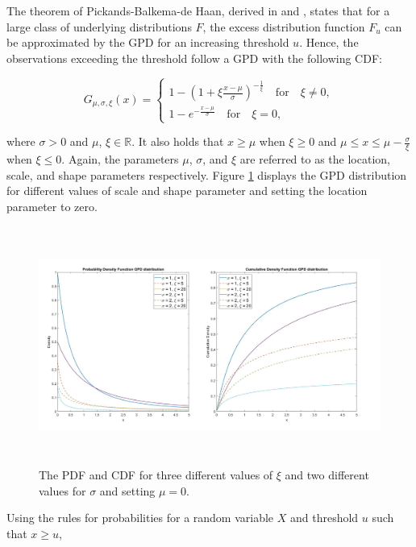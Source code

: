 \documentclass[a4paper,12pt]{article}
\theoremstyle{plain}
\begin{document}
The theorem of Pickands-Balkema-de Haan, derived in  and , states that for a large class of underlying distributions $F$, the excess distribution function $F_u$ can be approximated by the GPD for an increasing threshold $u$. Hence, the observations exceeding the threshold follow a GPD with the following CDF:

\begin{equation}
    G_{\mu, \sigma, \xi}(x) = \begin{cases}
               1 - (1 + \xi\frac{x-\mu}{\sigma})^{-\frac{1}{\xi}} \quad \textrm{for} \quad \xi\neq0,\\
               1 - e^{-\frac{x-\mu}{\sigma}} \quad \textrm{for} \quad \xi=0,
            \end{cases}
\label{eq:POT}
\end{equation}

\noindent where $\sigma>0$ and $\mu$, $\xi \in \mathbb{R}$. It also holds that $x\geq\mu$ when $\xi\geq0$ and $\mu\leq x \leq \mu - \frac{\sigma}{\xi}$ when $\xi \leq0$. Again, the parameters $\mu$, $\sigma$, and $\xi$ are referred to as the location, scale, and shape parameters respectively. Figure \ref{fig:gpd} displays the GPD distribution for different values of scale and shape parameter and setting the location parameter to zero.

\begin{figure}[H]
\includegraphics[height=7.8cm, width=\linewidth]{Figures/gpd.jpg} 
\caption{The PDF and CDF for three different values of $\xi$ and two different values for $\sigma$ and setting $\mu=0$.}
\label{fig:gpd}
\end{figure}

Using the rules for probabilities for a random variable $X$ and threshold $u$ such that $x \geq u$,
\end{document}

